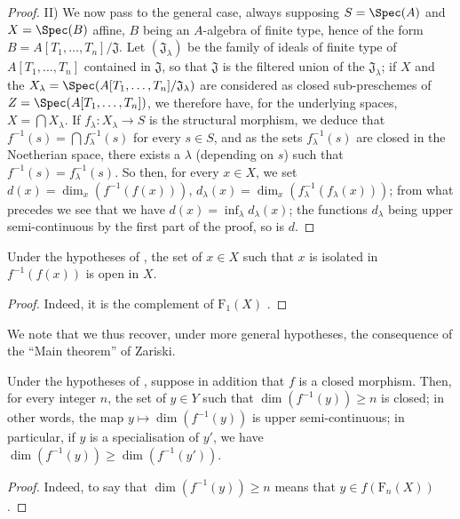 \begin{proof}
II) We now pass to the general case, always supposing $S=\Spec(A)$ and $X=\Spec(B)$ affine, $B$ being an $A$-algebra of finite type, hence of the form $B=A[T_1,\ldots,T_n]/\mathfrak{J}$.
Let $(\mathfrak{J}_\lambda)$ be the family of ideals of finite type of $A[T_1,\ldots,T_n]$ contained in $\mathfrak{J}$, so that $\mathfrak{J}$ is the filtered union of the $\mathfrak{J}_\lambda$; if $X$ and the $X_\lambda=\Spec(A[T_1,\ldots,T_n]/\mathfrak{J}_\lambda)$ are considered as closed sub-preschemes of $Z=\Spec(A[T_1,\ldots,T_n])$, we therefore have, for the underlying spaces, $X=\bigcap X_\lambda$.
If $f_\lambda:X_\lambda\to S$ is the structural morphism, we deduce that $f^{-1}(s)=\bigcap f_\lambda^{-1}(s)$ for every $s\in S$, and as the sets $f_\lambda^{-1}(s)$ are closed in the Noetherian space, there exists a $\lambda$ (depending on $s$) such that $f^{-1}(s)=f_\lambda^{-1}(s)$.
So then, for every $x\in X$, we set $d(x)=\dim_x(f^{-1}(f(x)))$, $d_\lambda(x)=\dim_x(f_\lambda^{-1}(f_\lambda(x)))$; from what precedes we see that we have $d(x)=\inf_\lambda d_\lambda(x)$; the functions $d_\lambda$ being upper semi-continuous by the first part of the proof, so is $d$.
\end{proof}

\begin{corollary}[13.1.4]
\label{IV.13.1.4}
Under the hypotheses of , the set of $x\in X$ such that $x$ is isolated in $f^{-1}(f(x))$ is open in $X$.
\end{corollary}

\begin{proof}
Indeed, it is the complement of $\mathrm{F}_1(X)$ .
\end{proof}

We note that we thus recover, under more general hypotheses, the consequence  of the ``Main theorem'' of Zariski.

\begin{corollary}[13.1.5]
\label{IV.13.1.5}
Under the hypotheses of , suppose in addition that $f$ is a closed morphism.
Then, for every integer $n$, the set of $y\in Y$ such that $\dim(f^{-1}(y))\geq n$ is closed; in other words, the map $y\mapsto\dim(f^{-1}(y))$ is upper semi-continuous; in particular, if $y$ is a specialisation of $y'$, we have $\dim(f^{-1}(y))\geq\dim(f^{-1}(y'))$.
\end{corollary}

\begin{proof}
Indeed, to say that $\dim(f^{-1}(y))\geq n$ means that $y\in f(\mathrm{F}_n(X))$ .
\end{proof}

